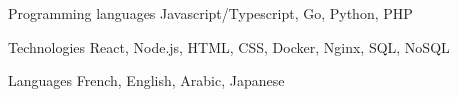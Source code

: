 

\begin{cvskills}

  \cvskill
    {Programming languages} %
    {Javascript/Typescript, Go, Python, PHP} %

  \cvskill
    {Technologies} %
    {React, Node.js, HTML, CSS, Docker, Nginx, SQL, NoSQL}  %

  \cvskill
    {Languages} %
    {French, English, Arabic, Japanese} %

\end{cvskills}
